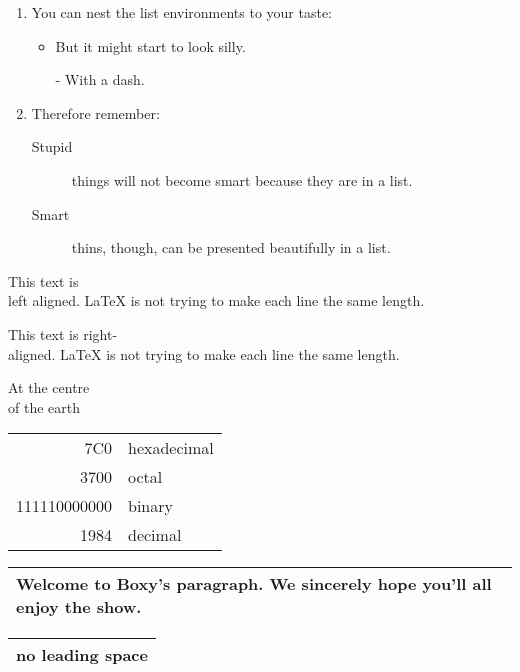 \documentclass{article}
\begin{document}
\flushleft
\begin{enumerate}
\item You can nest the list environments to your taste:
\begin{itemize}
\item But it might start to look silly.
\item[-] With a dash.
\end{itemize}
\item Therefore remember:
\begin{description}
\item[Stupid] things will not become smart because they are in a list.
\item[Smart] thins, though, can be presented beautifully in a list.
\end{description}
\end{enumerate}
\newpage
\begin{flushleft}
This text is\\ left aligned. \LaTeX{} is not trying to make each line the same length.
\end{flushleft}
\begin{flushright}
This text is right-\\aligned. \LaTeX{} is not trying to make each line the same length.
\end{flushright}
\begin{center}
At the centre\\ of the earth
\end{center}
\newpage
\begin{tabular}{|r|l|}
\hline
7C0 & hexadecimal \\
3700 & octal \\ \cline{2-2}
111110000000 & binary \\
\hline \hline
1984 & decimal \\
\hline
\end{tabular}
\newline
\newline
\newline
\begin{tabular}{|p{4.7cm}|}
\hline
Welcome to Boxy's paragraph.
We sincerely hope you'll all enjoy the show.\\
\hline
\end{tabular}
\newline
\newline
\newline
\begin{tabular}{@{} l @{}}
\hline
no leading space\\
\hline
\end{tabular}
\end{document}

